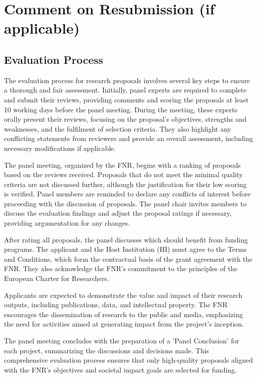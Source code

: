 \documentclass{article}
\begin{document}
\section{Comment on Resubmission (if applicable)}

\subsection{Evaluation Process}

The evaluation process for research proposals involves several key steps to ensure a thorough and fair assessment. Initially, panel experts are required to complete and submit their reviews, providing comments and scoring the proposals at least 10 working days before the panel meeting. During the meeting, these experts orally present their reviews, focusing on the proposal's objectives, strengths and weaknesses, and the fulfilment of selection criteria. They also highlight any conflicting statements from reviewers and provide an overall assessment, including necessary modifications if applicable.

The panel meeting, organized by the FNR, begins with a ranking of proposals based on the reviews received. Proposals that do not meet the minimal quality criteria are not discussed further, although the justification for their low scoring is verified. Panel members are reminded to declare any conflicts of interest before proceeding with the discussion of proposals. The panel chair invites members to discuss the evaluation findings and adjust the proposal ratings if necessary, providing argumentation for any changes.

After rating all proposals, the panel discusses which should benefit from funding programs. The applicant and the Host Institution (HI) must agree to the Terms and Conditions, which form the contractual basis of the grant agreement with the FNR. They also acknowledge the FNR's commitment to the principles of the European Charter for Researchers.

Applicants are expected to demonstrate the value and impact of their research outputs, including publications, data, and intellectual property. The FNR encourages the dissemination of research to the public and media, emphasizing the need for activities aimed at generating impact from the project's inception.

The panel meeting concludes with the preparation of a 'Panel Conclusion' for each project, summarizing the discussions and decisions made. This comprehensive evaluation process ensures that only high-quality proposals aligned with the FNR's objectives and societal impact goals are selected for funding.
\end{document}
